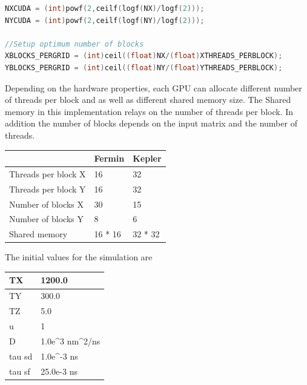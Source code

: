 \begin{lstlisting}[language=C++, label={lst:blocks}, caption={Device capacity calculation and number of block per grid}]	
NXCUDA = (int)powf(2,ceilf(logf(NX)/logf(2)));
NYCUDA = (int)powf(2,ceilf(logf(NY)/logf(2)));

//Setup optimum number of blocks
XBLOCKS_PERGRID = (int)ceil((float)NX/(float)XTHREADS_PERBLOCK); 
YBLOCKS_PERGRID = (int)ceil((float)NY/(float)YTHREADS_PERBLOCK);
\end{lstlisting}

Depending on the hardware properties, each GPU can allocate different number of threads per block and as well as different shared memory size. The Shared memory in this implementation relays on the number of threads per block. In addition the number of blocks depends on the input matrix and the number of threads.

\begin{table}[h]
\centering
\begin{tabular}{| l | l | l |}
\hline
 & Fermin & Kepler \\
\hline
Threads per block X  & 16 & 32 \\
\hline
Threads per block Y  & 16 & 32 \\
\hline
Number of blocks X & 30 & 15 \\
\hline
Number of blocks Y & 8 & 6 \\
\hline
Shared memory & 16 * 16 & 32 * 32 \\
\hline
\end{tabular}
\end{table}

The initial values for the simulation are

\begin{table}[h]
\centering
\begin{tabular}{| l | l |}
\hline
TX     & 1200.0                                         \\
\hline
TY     & 300.0                                          \\
\hline
TZ     & 5.0                                            \\
\hline
u      & 1                                              \\
\hline
D      & 1.0e\textasciicircum 3 nm\textasciicircum 2/ns \\
\hline
tau sd & 1.0e\textasciicircum -3 ns                     \\
\hline
tau sf & 25.0e-3 ns      \\
\hline
\end{tabular}
\end{table}

